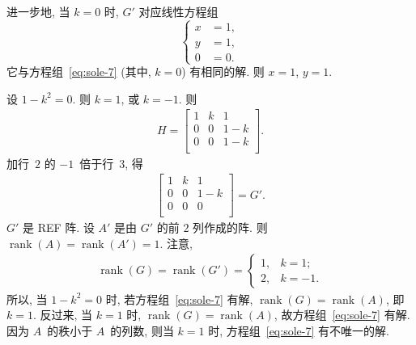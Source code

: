 \documentclass[../libro.tex]{subfiles}
\begin{document}
\begin{example}
    进一步地, 当 \(k = 0\) 时,
    \(G'\) 对应线性方程组
    \begin{equation*}
        \left\{ %
        \begin{aligned}
            x & = 1, \\
            y & = 1, \\
            0 & = 0.
        \end{aligned}
        \right. %
    \end{equation*}
    它与方程组~\eqref{eq:sole-7}
    (其中, \(k = 0\)) 有相同的解.
    则 \(x = 1\), \(y = 1\).

    设 \(1 - k^2 = 0\).
    则 \(k = 1\), 或 \(k = -1\).
    则
    \begin{align*}
        H =
        \begin{bmatrix}
            1 & k & 1   \\
            0 & 0 & 1-k \\
            0 & 0 & 1-k \\
        \end{bmatrix}.
    \end{align*}
    加行~\(2\) 的 \(-1\)~倍于行~\(3\),
    得
    \begin{align*}
        \begin{bmatrix}
            1 & k & 1   \\
            0 & 0 & 1-k \\
            0 & 0 & 0   \\
        \end{bmatrix}
        = G'.
    \end{align*}
    \(G'\) 是 REF 阵.
    设 \(A'\) 是由 \(G'\) 的前 \(2\) 列作成的阵.
    则 \(\operatorname{rank} {(A)}
    = \operatorname{rank} {(A')} = 1\).
    注意,
    \begin{align*}
        \operatorname{rank} {(G)}
        = \operatorname{rank} {(G')}
        =
        \begin{cases}
            1, & k = 1;  \\
            2, & k = -1.
        \end{cases}
    \end{align*}
    所以, 当 \(1 - k^2 = 0\) 时,
    若方程组~\eqref{eq:sole-7} 有解,
    \(\operatorname{rank} {(G)} = \operatorname{rank} {(A)}\),
    即 \(k = 1\).
    反过来, 当 \(k = 1\) 时,
    \(\operatorname{rank} {(G)} = \operatorname{rank} {(A)}\),
    故方程组~\eqref{eq:sole-7} 有解.
    因为 \(A\)~的秩小于 \(A\)~的列数,
    则当 \(k = 1\) 时,
    方程组~\eqref{eq:sole-7} 有不唯一的解.


\end{example}
\end{document}
